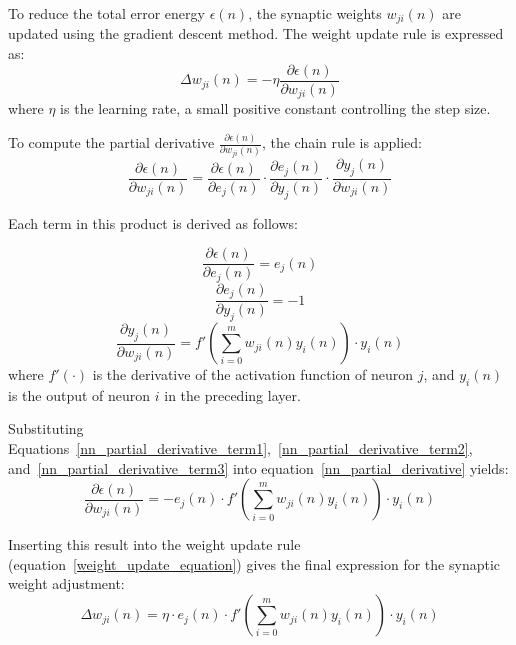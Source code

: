 To reduce the total error energy $\epsilon(n)$, the synaptic weights $w_{ji}(n)$ are updated using the gradient descent method. The weight update rule is expressed as:
\begin{equation} \label{weight_update_equation}
	\Delta w_{ji}(n) = -\eta \frac{\partial \epsilon(n)}{\partial w_{ji}(n)}
\end{equation}
where $\eta$ is the learning rate, a small positive constant controlling the step size.

To compute the partial derivative $\frac{\partial \epsilon(n)}{\partial w_{ji}(n)}$, the chain rule is applied:
\begin{equation} \label{nn_partial_derivative}
	\frac{\partial \epsilon(n)}{\partial w_{ji}(n)} =
	\frac{\partial \epsilon(n)}{\partial e_j(n)} \cdot
	\frac{\partial e_j(n)}{\partial y_j(n)} \cdot
	\frac{\partial y_j(n)}{\partial w_{ji}(n)}
\end{equation}

Each term in this product is derived as follows:

\begin{equation} \label{nn_partial_derivative_term1}
	\frac{\partial \epsilon(n)}{\partial e_j(n)} = e_j(n)
\end{equation}
\begin{equation} \label{nn_partial_derivative_term2}
	\frac{\partial e_j(n)}{\partial y_j(n)} = -1
\end{equation}
\begin{equation} \label{nn_partial_derivative_term3}
	\frac{\partial y_j(n)}{\partial w_{ji}(n)} =
	f'\left(\sum_{i=0}^{m} w_{ji}(n) y_i(n)\right) \cdot y_i(n)
\end{equation}
where $f'(\cdot)$ is the derivative of the activation function of neuron $j$, and $y_i(n)$ is the output of neuron $i$ in the preceding layer.

Substituting Equations~\ref{nn_partial_derivative_term1},~\ref{nn_partial_derivative_term2}, and~\ref{nn_partial_derivative_term3} into equation~\ref{nn_partial_derivative} yields:
\begin{equation}
	\frac{\partial \epsilon(n)}{\partial w_{ji}(n)} =
	-e_j(n) \cdot f'\left(\sum_{i=0}^{m} w_{ji}(n) y_i(n)\right) \cdot y_i(n)
\end{equation}

Inserting this result into the weight update rule (equation~\ref{weight_update_equation}) gives the final expression for the synaptic weight adjustment:
\begin{equation}
	\Delta w_{ji}(n) = \eta \cdot e_j(n) \cdot f'\left(\sum_{i=0}^{m} w_{ji}(n) y_i(n)\right) \cdot y_i(n)
\end{equation}

